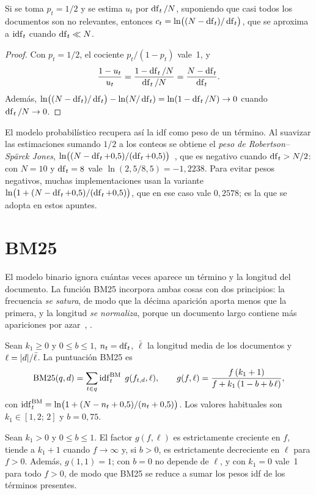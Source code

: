 \begin{corolario}\label{cor:rsj}
Si se toma $p_t=1/2$ y se estima $u_t$ por $\operatorname{df}_t/N$, suponiendo que casi todos los documentos son no relevantes, entonces $c_t=\ln\bigl((N-\operatorname{df}_t)/\operatorname{df}_t\bigr)$, que se aproxima a $\operatorname{idf}_t$ cuando $\operatorname{df}_t\ll N$.
\end{corolario}

\begin{proof}
Con $p_t=1/2$, el cociente $p_t/(1-p_t)$ vale~1, y
\[
\frac{1-u_t}{u_t}=\frac{1-\operatorname{df}_t/N}{\operatorname{df}_t/N}=\frac{N-\operatorname{df}_t}{\operatorname{df}_t}.
\] Además, $\ln\bigl((N-\operatorname{df}_t)/\operatorname{df}_t\bigr)-\ln(N/\operatorname{df}_t)=\ln(1-\operatorname{df}_t/N)\to 0$ cuando $\operatorname{df}_t/N\to 0$.
\end{proof}

El modelo probabilístico recupera así la idf como peso de un término. Al suavizar las estimaciones sumando $1/2$ a los conteos se obtiene el \emph{peso de Robertson--Spärck Jones}, $\ln\bigl((N-\operatorname{df}_t+0{,}5)/(\operatorname{df}_t+0{,}5)\bigr)$~\cite{rz}, que es negativo cuando $\operatorname{df}_t>N/2$: con $N=10$ y $\operatorname{df}_t=8$ vale $\ln(2{,}5/8{,}5)=-1{,}2238$. Para evitar pesos negativos, muchas implementaciones usan la variante $\ln\bigl(1+(N-\operatorname{df}_t+0{,}5)/(\operatorname{df}_t+0{,}5)\bigr)$, que en ese caso vale $0{,}2578$; es la que se adopta en estos apuntes.

\section{BM25}

El modelo binario ignora cuántas veces aparece un término y la longitud del documento. La función BM25 incorpora ambas cosas con dos principios: la frecuencia \emph{se satura}, de modo que la décima aparición aporta menos que la primera, y la longitud \emph{se normaliza}, porque un documento largo contiene más apariciones por azar~\cite[§11.4.3]{iir}, \cite{rz}.

\begin{definicion}[BM25]\label{def:bm25}
Sean $k_1\ge 0$ y $0\le b\le 1$, $n_t=\operatorname{df}_t$, $\bar\ell$ la longitud media de los documentos y $\ell=\lvert d\rvert/\bar\ell$. La puntuación BM25 es
\[
\operatorname{BM25}(q,d)=\sum_{t\in q}\operatorname{idf}^{\mathrm{BM}}_t\;g(f_{t,d},\ell),\qquad
g(f,\ell)=\frac{f\,(k_1+1)}{f+k_1\,(1-b+b\,\ell)},
\]
con $\operatorname{idf}^{\mathrm{BM}}_t=\ln\bigl(1+(N-n_t+0{,}5)/(n_t+0{,}5)\bigr)$. Los valores habituales son $k_1\in[1{,}2;\,2]$ y $b=0{,}75$.
\end{definicion}

\begin{proposicion}\label{prop:bm25}
Sean $k_1>0$ y $0\le b\le 1$. El factor $g(f,\ell)$ es estrictamente creciente en $f$, tiende a $k_1+1$ cuando $f\to\infty$ y, si $b>0$, es estrictamente decreciente en $\ell$ para $f>0$. Además, $g(1,1)=1$; con $b=0$ no depende de $\ell$, y con $k_1=0$ vale~1 para todo $f>0$, de modo que BM25 se reduce a sumar los pesos idf de los términos presentes.
\end{proposicion}

